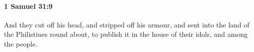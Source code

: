 
		\paragraph{1 Samuel 31:9} %
			\label{1SAMUEL-31-9}

			And they cut off his head, and stripped off his armour, and sent into the land of the Philistines round about, to publish it in the house of their idols, and among the people.


